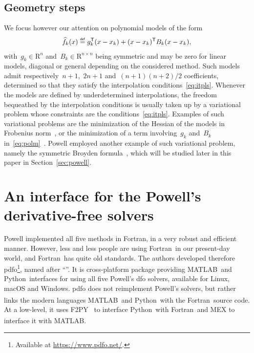 \documentclass[11pt,draft]{article}
\numberwithin{equation}{section}
\def\R{\ensuremath{\mathds{R}}}
\def\trps{\ensuremath{\mathsf{T}}}
\def\eqdef{\ensuremath{\mathrel{\stackrel{\text{\tiny\textsf{def}}}{=}}}}
\newcommand\objmdl[1][k]{\smash{\widehat{f}_{#1}}}
\newcommand\iter[1][k]{x_{#1}}
\newcommand\grad[1][k]{g_{#1}}
\newcommand\hess[1][k]{B_{#1}}
\def\R{\mbox{R}}
\def\fortran{\mbox{Fortran}}
\def\matlab{\mbox{MATLAB\textsuperscript{\textregistered}}}
\def\python{\mbox{Python}}
\begin{document}
\subsection{Geometry steps}

We focus however our attention on polynomial models of the form
\begin{equation}
    \label{eq:polm}
    \objmdl(x) \eqdef \grad^{\trps} (x - \iter) + (x - \iter)^{\trps} \hess (x - \iter),
\end{equation}
with~$\grad \in \R^n$ and~$\hess \in \R^{n \times n}$ being symmetric and may be zero for linear models, diagonal or general depending on the considered method.
Such models admit respectively~$n + 1$,~$2n + 1$ and~$(n + 1)(n + 2) / 2$ coefficients, determined so that they satisfy the interpolation conditions~\eqref{eq:itpls}.
Whenever the models are defined by underdetermined interpolations, the freedom bequeathed by the interpolation conditions is usually taken up by a variational problem whose constraints are the conditions~\eqref{eq:itpls}.
Examples of such variational problems are the minimization of the Hessian of the models in Frobenius norm~\cite{Conn_Scheinberg_Toint_1998, Wild_2008}, or the minimization of a term involving~$\grad$ and~$\hess$ in~\eqref{eq:polm}~\cite{Conn_Toint_1996}.
Powell employed another example of such variational problem, namely the symmetric Broyden formula~\cite{Powell_1970b, Powell_2004a}, which will be studied later in this paper in Section~\ref{sec:powell}.

\section{An interface for the Powell's derivative-free solvers}
\label{sec:pdfo}

Powell implemented all five methods in \fortran, in a very robust and efficient manner.
However, less and less people are using \fortran\ in our present-day world, and \fortran\ has quite old standards.
The authors developed therefore \gls{pdfo}\footnote{Available at \url{https://www.pdfo.net/}.}, named after \enquote{}.
It is cross-platform package providing \matlab\ and \python\ interfaces for using all five Powell's \gls{dfo} solvers, available for Linux, macOS and Windows.
\Gls{pdfo} does not reimplement Powell's solvers, but rather links the modern languages \matlab\ and \python\ with the \fortran\ source code.
At a low-level, it uses F2PY~\cite{Peterson_2009} to interface \python\ with \fortran\, and MEX to interface it with \matlab.
\end{document}

